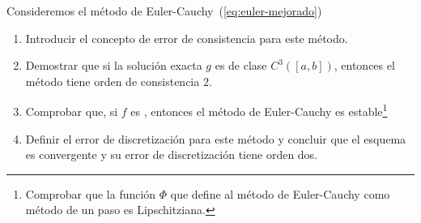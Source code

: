 \begin{EjerciciosPropuestos}
  \begin{problema}
    Consideremos el método de Euler-Cauchy~(\ref{eq:euler-mejorado})
    \begin{enumerate}
    \item Introducir el concepto de error de consistencia para este método.
    \item Demostrar que si la solución exacta $g$ es de clase
      $C^3([a,b])$, entonces el método tiene orden de consistencia 2.
    \item Comprobar que, si $f$ es \globLipschitz, entonces el método
      de Euler-Cauchy es estable\footnote{Comprobar que la función
        $\Phi$ que define al método de Euler-Cauchy como método de un
        paso es Lipschitziana.}
    \item Definir el error de discretización para este método y
      concluir que el esquema es convergente y su error de
      discretización tiene orden dos.
    \end{enumerate}
  \end{problema}
\end{EjerciciosPropuestos}

